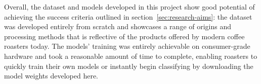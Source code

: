 Overall, the dataset and models developed in this project show good potential of achieving the success criteria outlined
in section~\ref{sec:research-aims}: the dataset was developed entirely from scratch and showcases a range of origins and
processing methods that is reflective of the products offered by modern coffee roasters today.
The models' training was entirely achievable on consumer-grade hardware and took a reasonable amount of time to complete,
enabling roasters to quickly train their own models or instantly begin classifying by downloading the model weights developed here.



